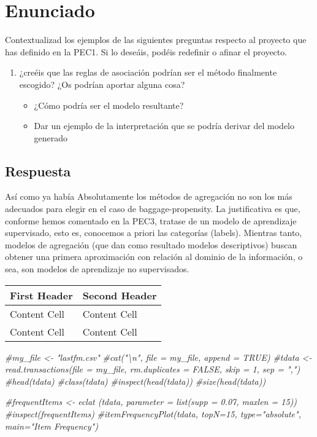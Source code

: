 \documentclass[]{article}
\newenvironment{Shaded}{\begin{snugshade}}{\end{snugshade}}
\newcommand{\CommentTok}[1]{\textcolor[rgb]{0.56,0.35,0.01}{\textit{#1}}}
\providecommand{\tightlist}{%
  \setlength{\itemsep}{0pt}\setlength{\parskip}{0pt}}
\begin{document}
\section{Enunciado}\label{enunciado}

Contextualizad los ejemplos de las siguientes preguntas respecto al
proyecto que has definido en la PEC1. Si lo deseáis, podéis redefinir o
afinar el proyecto.

\begin{enumerate}
\def\labelenumi{\arabic{enumi}.}
\tightlist
\item
  ¿creéis que las reglas de asociación podrían ser el método finalmente
  escogido? ¿Os podrían aportar alguna cosa?

  \begin{itemize}
  \tightlist
  \item
    ¿Cómo podría ser el modelo resultante?
  \item
    Dar un ejemplo de la interpretación que se podría derivar del modelo
    generado
  \end{itemize}
\end{enumerate}

\subsection{Respuesta}\label{respuesta}

Así como ya había Absolutamente los métodos de agregación no son los más
adecuados para elegir en el caso de baggage-propensity. La justificativa
es que, conforme hemos comentado en la PEC3, tratase de un modelo de
aprendizaje supervisado, esto es, conocemos a priori las categorías
(labels). Mientras tanto, modelos de agregación (que dan como resultado
modelos descriptivos) buscan obtener una primera aproximación con
relación al dominio de la información, o sea, son modelos de aprendizaje
no supervisados.

\begin{longtable}[]{@{}ll@{}}
\toprule
First Header & Second Header\tabularnewline
\midrule
\endhead
Content Cell & Content Cell\tabularnewline
Content Cell & Content Cell\tabularnewline
\bottomrule
\end{longtable}

\begin{Shaded}
\begin{Highlighting}[]
\CommentTok{#my_file <- "lastfm.csv"}
\CommentTok{#cat("\textbackslash{}n", file = my_file, append = TRUE)}
\CommentTok{#tdata <- read.transactions(file = my_file, rm.duplicates = FALSE, skip = 1, sep = ",")}
\CommentTok{#head(tdata)}
\CommentTok{#class(tdata)}
\CommentTok{#inspect(head(tdata))}
\CommentTok{#size(head(tdata)) }

\CommentTok{#frequentItems <- eclat (tdata, parameter = list(supp = 0.07, maxlen = 15))}
\CommentTok{#inspect(frequentItems)}
\CommentTok{#itemFrequencyPlot(tdata, topN=15, type="absolute", main="Item Frequency") }
\end{Highlighting}
\end{Shaded}
\end{document}
